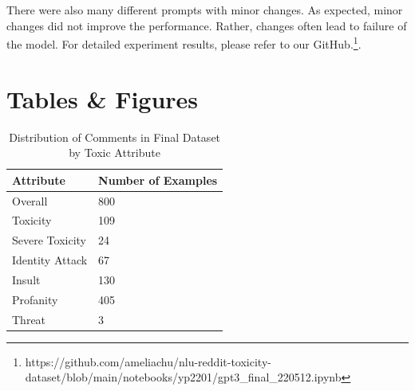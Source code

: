 \documentclass[11pt]{article}
\begin{document}
There were also many different prompts with minor changes. As expected, minor changes did not improve the performance. Rather, changes often lead to failure of the model. For detailed experiment results, please refer to our GitHub.\footnote{https://github.com/ameliachu/nlu-reddit-toxicity-dataset/blob/main/notebooks/yp2201/gpt3_final_220512.ipynb}.
\newpage
\section{Tables \& Figures}
\label{sec:appendix}

\begin{table}[h]
\centering
\begin{tabular}{ll}
\hline
\textbf{Attribute} & \textbf{Number of Examples} \\ \hline
Overall            & 800                         \\ \hline
Toxicity           & 109                         \\
Severe Toxicity    & 24                          \\
Identity Attack    & 67                          \\
Insult             & 130                         \\
Profanity          & 405                         \\
Threat             & 3                           \\ \hline
\end{tabular}
\caption{\label{data-distribution}
Distribution of Comments in Final Dataset by Toxic Attribute  }
\end{table}
\end{document}
